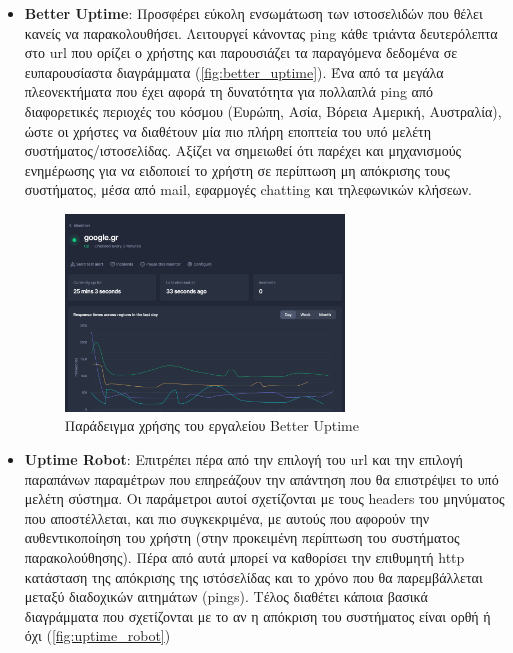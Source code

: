 \begin{itemize}
	\item \textbf{Better Uptime}: Προσφέρει εύκολη ενσωμάτωση των ιστοσελιδών που θέλει κανείς να παρακολουθήσει.
	      Λειτουργεί κάνοντας ping κάθε τριάντα δευτερόλεπτα στο url που ορίζει ο χρήστης και παρουσιάζει
	      τα παραγόμενα δεδομένα σε ευπαρουσίαστα διαγράμματα (\autoref{fig:better_uptime}). Ένα από τα μεγάλα πλεονεκτήματα που έχει αφορά
	      τη δυνατότητα για πολλαπλά ping από διαφορετικές περιοχές του κόσμου (Ευρώπη, Ασία, Βόρεια Αμερική, Αυστραλία),
	      ώστε οι χρήστες να διαθέτουν μία πιο πλήρη εποπτεία του υπό μελέτη συστήματος/ιστοσελίδας. Αξίζει να σημειωθεί
	      ότι παρέχει και μηχανισμούς ενημέρωσης για να ειδοποιεί το χρήστη σε περίπτωση μη απόκρισης τους συστήματος, μέσα
	      από mail, εφαρμογές chatting και τηλεφωνικών κλήσεων.
	      \begin{figure}[!ht]
		      \centering
		      \includegraphics[width=0.7\textwidth]{./images/chapter3/better-uptime-cropped.png}
		      \caption[Παράδειγμα χρήσης του εργαλείου Better Uptime]{Παράδειγμα χρήσης του εργαλείου Better Uptime}
		      \label{fig:better_uptime}
	      \end{figure}
	\item \textbf{Uptime Robot}: Επιτρέπει πέρα από την επιλογή του url και την επιλογή παραπάνων παραμέτρων που επηρεάζουν
	      την απάντηση που θα επιστρέψει το υπό μελέτη σύστημα. Οι παράμετροι αυτοί σχετίζονται με τους headers του μηνύματος που
	      αποστέλλεται, και πιο συγκεκριμένα, με αυτούς που αφορούν την αυθεντικοποίηση του χρήστη (στην προκειμένη περίπτωση
	      του συστήματος παρακολούθησης). Πέρα από αυτά μπορεί να καθορίσει την επιθυμητή http κατάσταση της απόκρισης
	      της ιστόσελίδας και το χρόνο που θα παρεμβάλλεται μεταξύ διαδοχικών αιτημάτων (pings). Τέλος διαθέτει κάποια βασικά διαγράμματα
	      που σχετίζονται με το αν η απόκριση του συστήματος είναι ορθή ή όχι (\autoref{fig:uptime_robot})

\end{itemize}
